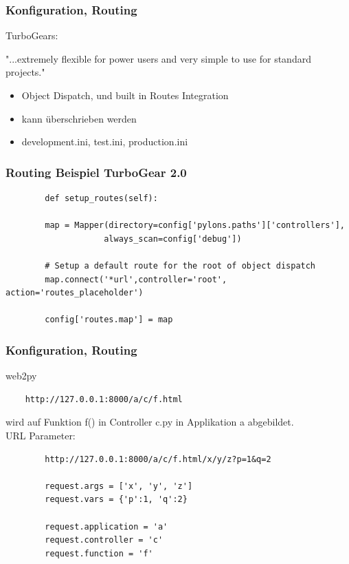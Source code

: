 \documentclass[
    t,
    smaller,
    compress,
]{beamer}
\begin{document}
\begin{frame}
  \frametitle{Konfiguration, Routing}
TurboGears:

"...extremely flexible for power users and very simple to use for standard projects."

  	 \begin{itemize}[<1->]
    	\item Object Dispatch, und built in Routes Integration
    	\item kann überschrieben werden
    	\item development.ini, test.ini, production.ini
    	
 	\end{itemize}
\end{frame}  
\begin{frame}[fragile]
\frametitle{Routing Beispiel TurboGear 2.0}
\begin{lstlisting}	
		def setup_routes(self):
		
		map = Mapper(directory=config['pylons.paths']['controllers'],
		            always_scan=config['debug'])
		
		# Setup a default route for the root of object dispatch
		map.connect('*url',controller='root', action='routes_placeholder')

		config['routes.map'] = map
\end{lstlisting}
\end{frame}



\begin{frame}[fragile]
  \frametitle{Konfiguration, Routing}
web2py

\begin{lstlisting}
	http://127.0.0.1:8000/a/c/f.html
\end{lstlisting}

	wird auf Funktion f() in Controller c.py in Applikation a abgebildet. \\
	
	URL Parameter:
	
	\begin{lstlisting}
		http://127.0.0.1:8000/a/c/f.html/x/y/z?p=1&q=2
		
		request.args = ['x', 'y', 'z']
		request.vars = {'p':1, 'q':2}
		
		request.application = 'a'
		request.controller = 'c'
		request.function = 'f'
		
	\end{lstlisting}

\end{frame}
\end{document}
